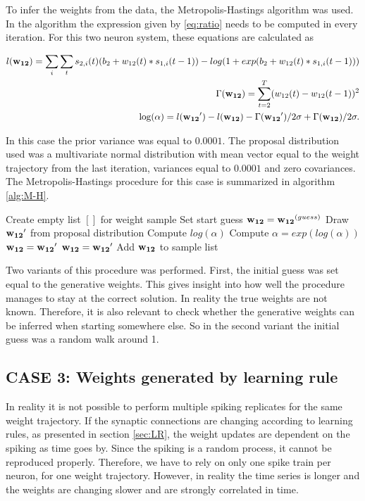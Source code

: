 To infer the weights from the data, the Metropolis-Hastings algorithm was used. In the algorithm the expression given by \ref{eq:ratio} needs to be computed in every iteration. For this two neuron system, these equations are calculated as

\begin{equation}
\begin{split}
    l({\bf w_{12}}) = \sum_i \sum_t s_{2,i}(t)(b_2 + w_{12}(t)*s_{1,i}(t-1)) - log(1 + exp(b_2 + w_{12}(t) * s_{1,i}(t-1))) \\
    \Gamma({\bf w_{12}}) = \sum_{t=2}^T (w_{12}(t) - w_ {12}(t-1))^2\\
    \log ( \alpha) = l({\bf w_{12}}') - l({\bf w_{12}}) - \Gamma({\bf w_{12}}')/2\sigma + \Gamma({\bf w_{12}})/2\sigma.
\end{split}
\end{equation}

In this case the prior variance was equal to $ 0.0001$. The proposal distribution used was a multivariate normal distribution with mean vector equal to the weight trajectory from the last iteration, variances equal to $0.0001$ and zero covariances. 
The Metropolis-Hastings procedure for this case is summarized in algorithm \ref{alg:M-H}.

\begin{algorithm}
\caption{}\label{alg:M-H}
\begin{algorithmic}
\State Create empty list $[]$ for weight sample
\State Set start guess ${\bf w_{12}} = {\bf w_{12}}^{(guess)}$
\State Draw ${\bf w_{12}}'$ from proposal distribution
\State Compute $log(\alpha)$
\State Compute $\alpha = exp(log(\alpha))$
\State ${\bf w_{12}} = {\bf w_{12}}'$
\Else 
{}
\State ${\bf w_{12}} = {\bf w_{12}}'$
\EndIf
\EndIf
\State Add ${\bf w_{12}}$ to sample list
\EndFor
\end{algorithmic}
\end{algorithm}

Two variants of this procedure was performed. First, the initial guess was set equal to the generative weights. This gives insight into how well the procedure manages to stay at the correct solution. In reality the true weights are not known. Therefore, it is also relevant to check whether the generative weights can be inferred when starting somewhere else. So in the second variant the initial guess was a random walk around 1. 

\subsection{CASE 3: Weights generated by learning rule}
In reality it is not possible to perform multiple spiking replicates for the same weight trajectory. If the synaptic connections are changing according to learning rules, as presented in section \ref{sec:LR}, the weight updates are dependent on the spiking as time goes by. Since the spiking is a random process, it cannot be reproduced properly. Therefore, we have to rely on only one spike train per neuron, for one weight trajectory. However, in reality the time series is longer and the weights are changing slower and are strongly correlated in time. 

